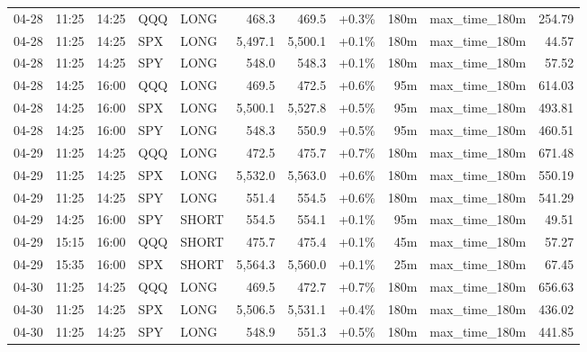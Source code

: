 \documentclass[11pt,a4paper,twoside]{article}
\begin{document}
\begin{center}
\begin{longtable}{>{\color{txtmain}}l l l l l r r r r >{\color{txtmain}}l r}
04-28 & 11:25 & 14:25 & QQQ & LONG & 468.3 & 469.5 & \textcolor{wingreen}{+0.3\%} & 180m & max\_time\_180m & \textcolor{wingreen}{254.79} \\
04-28 & 11:25 & 14:25 & SPX & LONG & 5,497.1 & 5,500.1 & \textcolor{wingreen}{+0.1\%} & 180m & max\_time\_180m & \textcolor{wingreen}{44.57} \\
04-28 & 11:25 & 14:25 & SPY & LONG & 548.0 & 548.3 & \textcolor{wingreen}{+0.1\%} & 180m & max\_time\_180m & \textcolor{wingreen}{57.52} \\
04-28 & 14:25 & 16:00 & QQQ & LONG & 469.5 & 472.5 & \textcolor{wingreen}{+0.6\%} & 95m & max\_time\_180m & \textcolor{wingreen}{614.03} \\
04-28 & 14:25 & 16:00 & SPX & LONG & 5,500.1 & 5,527.8 & \textcolor{wingreen}{+0.5\%} & 95m & max\_time\_180m & \textcolor{wingreen}{493.81} \\
04-28 & 14:25 & 16:00 & SPY & LONG & 548.3 & 550.9 & \textcolor{wingreen}{+0.5\%} & 95m & max\_time\_180m & \textcolor{wingreen}{460.51} \\
04-29 & 11:25 & 14:25 & QQQ & LONG & 472.5 & 475.7 & \textcolor{wingreen}{+0.7\%} & 180m & max\_time\_180m & \textcolor{wingreen}{671.48} \\
04-29 & 11:25 & 14:25 & SPX & LONG & 5,532.0 & 5,563.0 & \textcolor{wingreen}{+0.6\%} & 180m & max\_time\_180m & \textcolor{wingreen}{550.19} \\
04-29 & 11:25 & 14:25 & SPY & LONG & 551.4 & 554.5 & \textcolor{wingreen}{+0.6\%} & 180m & max\_time\_180m & \textcolor{wingreen}{541.29} \\
04-29 & 14:25 & 16:00 & SPY & SHORT & 554.5 & 554.1 & \textcolor{wingreen}{+0.1\%} & 95m & max\_time\_180m & \textcolor{wingreen}{49.51} \\
04-29 & 15:15 & 16:00 & QQQ & SHORT & 475.7 & 475.4 & \textcolor{wingreen}{+0.1\%} & 45m & max\_time\_180m & \textcolor{wingreen}{57.27} \\
04-29 & 15:35 & 16:00 & SPX & SHORT & 5,564.3 & 5,560.0 & \textcolor{wingreen}{+0.1\%} & 25m & max\_time\_180m & \textcolor{wingreen}{67.45} \\
04-30 & 11:25 & 14:25 & QQQ & LONG & 469.5 & 472.7 & \textcolor{wingreen}{+0.7\%} & 180m & max\_time\_180m & \textcolor{wingreen}{656.63} \\
04-30 & 11:25 & 14:25 & SPX & LONG & 5,506.5 & 5,531.1 & \textcolor{wingreen}{+0.4\%} & 180m & max\_time\_180m & \textcolor{wingreen}{436.02} \\
04-30 & 11:25 & 14:25 & SPY & LONG & 548.9 & 551.3 & \textcolor{wingreen}{+0.5\%} & 180m & max\_time\_180m & \textcolor{wingreen}{441.85} \\

\end{longtable}
\end{center}
\end{document}
